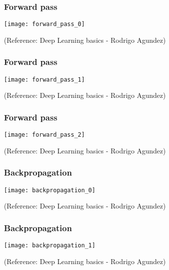 \begin{frame}[fragile] \frametitle{Forward pass}

\begin{center}
\texttt{[image: forward\_pass\_0]}

\end{center}

\tiny{(Reference: Deep Learning basics - Rodrigo Agundez)}

\end{frame}

\begin{frame}[fragile] \frametitle{Forward pass}

\begin{center}
\texttt{[image: forward\_pass\_1]}

\end{center}

\tiny{(Reference: Deep Learning basics - Rodrigo Agundez)}

\end{frame}

\begin{frame}[fragile] \frametitle{Forward pass}

\begin{center}
\texttt{[image: forward\_pass\_2]}

\end{center}

\tiny{(Reference: Deep Learning basics - Rodrigo Agundez)}

\end{frame}

\begin{frame}[fragile] \frametitle{Backpropagation}

\begin{center}
\texttt{[image: backpropagation\_0]}

\end{center}

\tiny{(Reference: Deep Learning basics - Rodrigo Agundez)}

\end{frame}

\begin{frame}[fragile] \frametitle{Backpropagation}

\begin{center}
\texttt{[image: backpropagation\_1]}

\end{center}

\tiny{(Reference: Deep Learning basics - Rodrigo Agundez)}

\end{frame}


